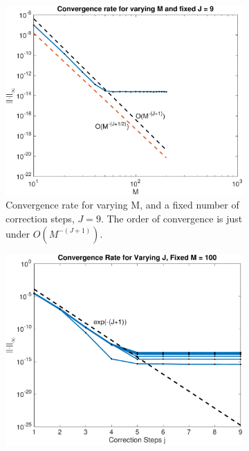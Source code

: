 \documentclass{sfuthesis}
\begin{document}
 \begin{figure}[h]
        \centering
        \begin{subfigure}[t]{0.47\textwidth}
        		\includegraphics[width=\textwidth]{Ex6-6CapSDCConvergenceVaryMfixJ}
			\caption{Convergence rate for varying M, and a fixed number of correction steps, $J=9$. The order of convergence is just under $O(M^{-(J+1)})$. \vspace{0.78cm}}
     \end{subfigure} \hspace{0.3cm}
      \begin{subfigure}[t]{0.47\textwidth}
                	\includegraphics[width=\textwidth]{Ex6-6CapSDCConvergenceVaryJfixM}

\end{subfigure}
\end{figure}
\end{document}
